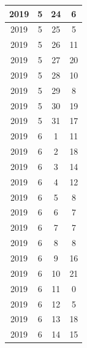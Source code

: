 \begin{longtable} {|c|c|c|c|}
\hline
2019         & 5            & 24           & 6                         \\ 
\hline
2019         & 5            & 25           & 5                         \\ 
\hline
2019         & 5            & 26           & 11                        \\ 
\hline
2019         & 5            & 27           & 20                        \\ 
\hline
2019         & 5            & 28           & 10                        \\ 
\hline
2019         & 5            & 29           & 8                         \\ 
\hline
2019         & 5            & 30           & 19                        \\ 
\hline
2019         & 5            & 31           & 17                        \\ 
\hline
2019         & 6            & 1            & 11                        \\ 
\hline
2019         & 6            & 2            & 18                        \\ 
\hline
2019         & 6            & 3            & 14                        \\ 
\hline
2019         & 6            & 4            & 12                        \\ 
\hline
2019         & 6            & 5            & 8                         \\ 
\hline
2019         & 6            & 6            & 7                         \\ 
\hline
2019         & 6            & 7            & 7                         \\ 
\hline
2019         & 6            & 8            & 8                         \\ 
\hline
2019         & 6            & 9            & 16                        \\ 
\hline
2019         & 6            & 10           & 21                        \\ 
\hline
2019         & 6            & 11           & 0                         \\ 
\hline
2019         & 6            & 12           & 5                         \\ 
\hline
2019         & 6            & 13           & 18                        \\ 
\hline
2019         & 6            & 14           & 15                        \\ 

\end{longtable}
